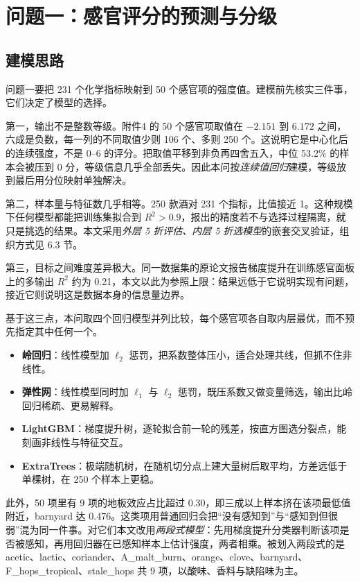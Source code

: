 \section{问题一：感官评分的预测与分级}

\subsection{建模思路}

问题一要把 231 个化学指标映射到 50 个感官项的强度值。建模前先核实三件事，它们决定了模型的选择。

第一，输出不是整数等级。附件4 的 50 个感官项取值在 $-2.151$ 到 $6.172$ 之间，六成是负数，每一列的不同取值少则 106 个、多则 250 个。这说明它是中心化后的连续强度，不是 0--6 的评分。把取值平移到非负再四舍五入，中位 53.2\% 的样本会被压到 0 分，等级信息几乎全部丢失。因此本问按\emph{连续值回归}建模，等级放到最后用分位映射单独解决。

第二，样本量与特征数几乎相等。250 款酒对 231 个指标，比值接近 1。这种规模下任何模型都能把训练集拟合到 $R^2>0.9$，报出的精度若不与选择过程隔离，就只是挑选的结果。本文采用\emph{外层 5 折评估、内层 5 折选模型}的嵌套交叉验证，组织方式见 6.3 节。

第三，目标之间难度差异极大。同一数据集的原论文\cite{schreurs2024}报告梯度提升在训练感官面板上的多输出 $R^2$ 约为 0.21，本文以此为参照上限：结果远低于它说明实现有问题，接近它则说明这是数据本身的信息量边界。

基于这三点，本问取四个回归模型并列比较，每个感官项各自取内层最优，而不预先指定其中任何一个。

\begin{itemize}
  \item \textbf{岭回归}：线性模型加 $\ell_2$ 惩罚，把系数整体压小，适合处理共线，但抓不住非线性。
  \item \textbf{弹性网}：线性模型同时加 $\ell_1$ 与 $\ell_2$ 惩罚，既压系数又做变量筛选，输出比岭回归稀疏、更易解释。
  \item \textbf{LightGBM}：梯度提升树，逐轮拟合前一轮的残差，按直方图选分裂点，能刻画非线性与特征交互。
  \item \textbf{ExtraTrees}：极端随机树，在随机切分点上建大量树后取平均，方差远低于单棵树，在 250 个样本上更稳。
\end{itemize}

此外，50 项里有 9 项的地板效应占比超过 0.30，即三成以上样本挤在该项最低值附近，barnyard 达 0.476。这类项用普通回归会把“没有感知到”与“感知到但很弱”混为同一件事。对它们本文改用\emph{两段式模型}：先用梯度提升分类器判断该项是否被感知，再用回归器在已感知样本上估计强度，两者相乘。被划入两段式的是 acetic、lactic、coriander、A\_malt\_burn、orange、clove、barnyard、F\_hops\_tropical、stale\_hops 共 9 项，以酸味、香料与缺陷味为主。

